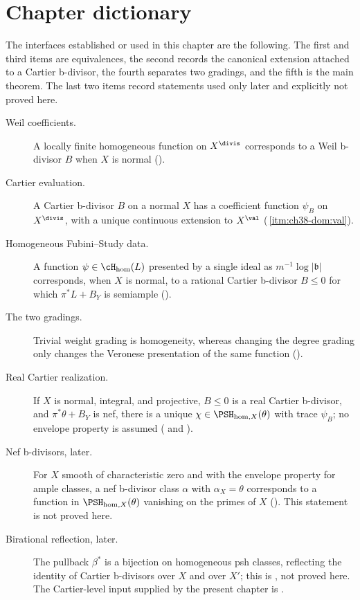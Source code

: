\section{Chapter dictionary}
\label{sec:ch38-dictionary}

The interfaces established or used in this chapter are the following.
The first and third items are equivalences, the second records the canonical
extension attached to a Cartier b-divisor, the fourth separates two
gradings, and the fifth is the main theorem.  The last two items record
statements used only later and explicitly not proved here.

\begin{description}
\item[Weil coefficients.]
  A locally finite homogeneous function on $X^{\divis}$ corresponds to a
  Weil b-divisor $B$ when $X$ is normal
  ().
\item[Cartier evaluation.]
  A Cartier b-divisor $B$ on a normal $X$ has a coefficient function
  $\psi_B$ on $X^{\divis}$, with a unique continuous extension to
  $X^{\val}$
  (\,\cref{itm:ch38-dom:val}).
\item[Homogeneous Fubini--Study data.]
  A function $\psi\in\cH_{\mathrm{hom}}(L)$ presented by a single ideal as
  $m^{-1}\log|\mathfrak b|$ corresponds, when $X$ is normal, to a rational
  Cartier b-divisor $B\leq0$ for which $\pi^*L+B_Y$ is semiample
  ().
\item[The two gradings.]
  Trivial weight grading is homogeneity, whereas changing the degree grading
  only changes the Veronese presentation of the same function
  ().
\item[Real Cartier realization.]
  If $X$ is normal, integral, and projective, $B\leq0$ is a real Cartier
  b-divisor, and $\pi^*\theta+B_Y$ is nef, there is a unique
  $\chi\in\PSH_{\mathrm{hom},X}(\theta)$ with trace $\psi_B$; no envelope
  property is assumed
  ( and
  ).
\item[Nef b-divisors, later.]
  For $X$ smooth of characteristic zero and with the envelope property for
  ample classes, a nef b-divisor class $\alpha$ with $\alpha_X=\theta$
  corresponds to a function in $\PSH_{\mathrm{hom},X}(\theta)$ vanishing on
  the primes of $X$ ().  This
  statement is not proved here.
\item[Birational reflection, later.]
  The pullback $\beta^*$ is a bijection on homogeneous psh classes, reflecting
  the identity of Cartier b-divisors over $X$ and over $X'$; this is
  , not proved here.  The Cartier-level
  input supplied by the present chapter is
  .
\end{description}

